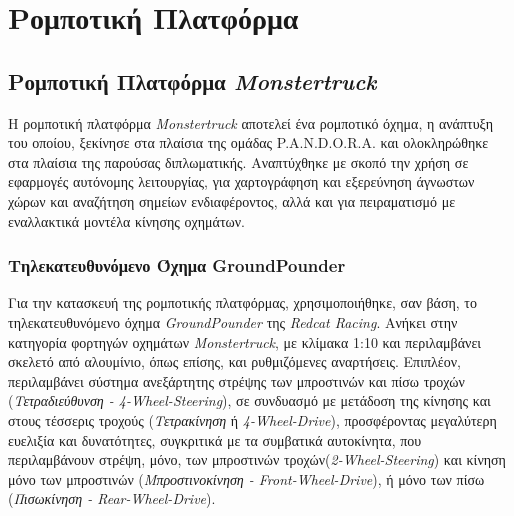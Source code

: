 
\chapter{Ρομποτική Πλατφόρμα} %


\label{Chapter2} %

\section{Ρομποτική Πλατφόρμα \textit{Monstertruck}}
Η ρομποτική πλατφόρμα \textit{Monstertruck} αποτελεί ένα ρομποτικό όχημα, η ανάπτυξη του οποίου, ξεκίνησε στα πλαίσια της ομάδας P.A.N.D.O.R.A. και ολοκληρώθηκε στα πλαίσια της παρούσας διπλωματικής. Αναπτύχθηκε με σκοπό την χρήση σε εφαρμογές αυτόνομης λειτουργίας, για χαρτογράφηση και εξερεύνηση άγνωστων χώρων και αναζήτηση σημείων ενδιαφέροντος, αλλά και για πειραματισμό με εναλλακτικά μοντέλα κίνησης οχημάτων.

\subsection{Τηλεκατευθυνόμενο Όχημα GroundPounder}
Για την κατασκευή της ρομποτικής πλατφόρμας, χρησιμοποιήθηκε, σαν βάση, το τηλεκατευθυνόμενο όχημα \textit{GroundPounder} της \textit{Redcat Racing}. Ανήκει στην κατηγορία φορτηγών οχημάτων \textit{Monstertruck}, με κλίμακα 1:10 και περιλαμβάνει σκελετό από αλουμίνιο, όπως επίσης, και ρυθμιζόμενες αναρτήσεις. Επιπλέον, περιλαμβάνει σύστημα ανεξάρτητης στρέψης των μπροστινών και πίσω τροχών (\textit{Τετραδιεύθυνση - 4-Wheel-Steering}), σε συνδυασμό με μετάδοση της κίνησης και στους τέσσερις τροχούς (\textit{Τετρακίνηση} ή \textit{4-Wheel-Drive}), προσφέροντας μεγαλύτερη ευελιξία και δυνατότητες, συγκριτικά με τα συμβατικά αυτοκίνητα, που περιλαμβάνουν στρέψη, μόνο, των μπροστινών τροχών(\textit{2-Wheel-Steering}) και κίνηση μόνο των μπροστινών (\textit{Μπροστινοκίνηση - Front-Wheel-Drive}), ή μόνο των πίσω (\textit{Πισωκίνηση - Rear-Wheel-Drive}).

